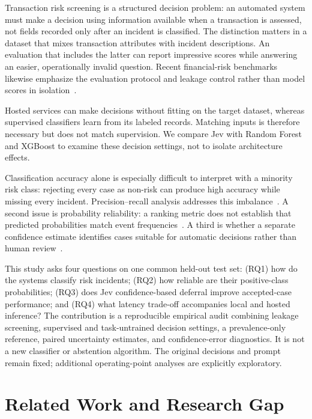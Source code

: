 \documentclass{llncs}
\begin{document}
Transaction risk screening is a structured decision problem: an automated system must make a decision using information available when a transaction is assessed, not fields recorded only after an incident is classified. The distinction matters in a dataset that mixes transaction attributes with incident descriptions. An evaluation that includes the latter can report impressive scores while answering an easier, operationally invalid question. Recent financial-risk benchmarks likewise emphasize the evaluation protocol and leakage control rather than model scores in isolation~\cite{mishra2026erp,zeng2026fraudbench}.

Hosted services can make decisions without fitting on the target dataset, whereas supervised classifiers learn from its labeled records. Matching inputs is therefore necessary but does not match supervision. We compare Jev with Random Forest and XGBoost to examine these decision settings, not to isolate architecture effects.

Classification accuracy alone is especially difficult to interpret with a minority risk class: rejecting every case as non-risk can produce high accuracy while missing every incident. Precision--recall analysis addresses this imbalance~\cite{davis2006pr}. A second issue is probability reliability: a ranking metric does not establish that predicted probabilities match event frequencies~\cite{guo2017calibration,haotian2023recal}. A third is whether a separate confidence estimate identifies cases suitable for automatic decisions rather than human review~\cite{singh2026abstention}.

This study asks four questions on one common held-out test set: (RQ1) how do the systems classify risk incidents; (RQ2) how reliable are their positive-class probabilities; (RQ3) does Jev confidence-based deferral improve accepted-case performance; and (RQ4) what latency trade-off accompanies local and hosted inference? The contribution is a reproducible empirical audit combining leakage screening, supervised and task-untrained decision settings, a prevalence-only reference, paired uncertainty estimates, and confidence-error diagnostics. It is not a new classifier or abstention algorithm. The original decisions and prompt remain fixed; additional operating-point analyses are explicitly exploratory.

\section{Related Work and Research Gap}\label{sec:related}
\end{document}
